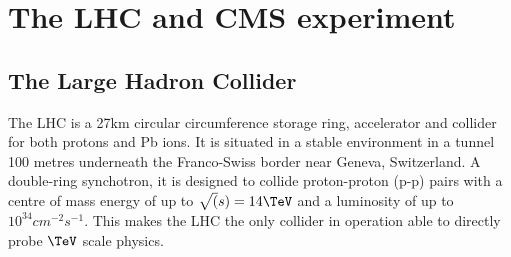
\chapter{The LHC and CMS experiment} %
\section{The Large Hadron Collider}
\label{lhc_intro}
The LHC is a 27km circular circumference storage ring, accelerator and collider for 
both protons and Pb ions. It is situated in a stable environment in a tunnel 
100 metres underneath the Franco-Swiss border near Geneva, Switzerland.
A double-ring synchotron, it is designed to collide proton-proton (p-p)
pairs with a centre of mass energy of up to $\sqrt(s)=14\TeV$ and a 
luminosity of up to $10^{34}cm^{-2}s^{-1}$. This makes the LHC the only collider
in operation able to directly probe $\TeV$ scale physics. 

